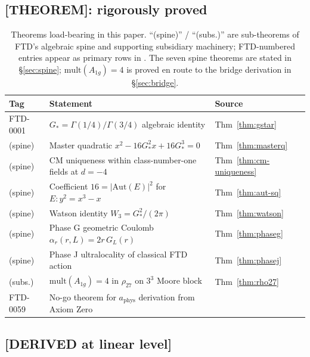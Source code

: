 \documentclass[11pt,reqno]{amsart}
\theoremstyle{plain}
\theoremstyle{definition}
\theoremstyle{remark}
\numberwithin{equation}{section}
\newcommand{\Aoneg}{A_{1g}}
\newcommand{\Gstar}{G_{\!*}}
\begin{document}
\subsection{[THEOREM]: rigorously proved}

\begin{table}[h]
\centering
\small
\begin{tabular}{l p{8.0cm} l}
\toprule
Tag & Statement & Source \\
\midrule
FTD-0001 & $\Gstar = \Gamma(1/4)/\Gamma(3/4)$ algebraic identity & Thm~\ref{thm:gstar} \\
(spine) & Master quadratic $x^{2} - 16\Gstar^{2}x + 16\Gstar^{3} = 0$ & Thm~\ref{thm:masterq} \\
(spine) & CM uniqueness within class-number-one fields at $d=-4$ & Thm~\ref{thm:cm-uniqueness} \\
(spine) & Coefficient $16 = |\mathrm{Aut}(E)|^{2}$ for $E\colon y^{2}=x^{3}-x$ & Thm~\ref{thm:aut-sq} \\
(spine) & Watson identity $W_{3} = \Gstar^{2}/(2\pi)$ & Thm~\ref{thm:watson} \\
(spine) & Phase G geometric Coulomb $\alpha_{r}(r,L) = 2r\,G_{L}(r)$ & Thm~\ref{thm:phaseg} \\
(spine) & Phase J ultralocality of classical FTD action & Thm~\ref{thm:phasej} \\
\midrule
(subs.) & $\mathrm{mult}(\Aoneg) = 4$ in $\rho_{27}$ on $3^{3}$ Moore block & Thm~\ref{thm:rho27} \\
FTD-0059 & No-go theorem for $a_{\mathrm{phys}}$ derivation from Axiom Zero & \cite{ledger} \\
\bottomrule
\end{tabular}
\caption{Theorems load-bearing in this paper. ``(spine)'' / ``(subs.)''
are sub-theorems of FTD's algebraic spine and supporting subsidiary
machinery; FTD-numbered entries appear as primary rows in
\cite{ledger}. The seven spine theorems are stated in
\S\ref{sec:spine}; $\mathrm{mult}(\Aoneg) = 4$ is proved en route
to the bridge derivation in \S\ref{sec:bridge}.}
\label{tab:theorems}
\end{table}

\subsection{[DERIVED at linear level]}
\end{document}

